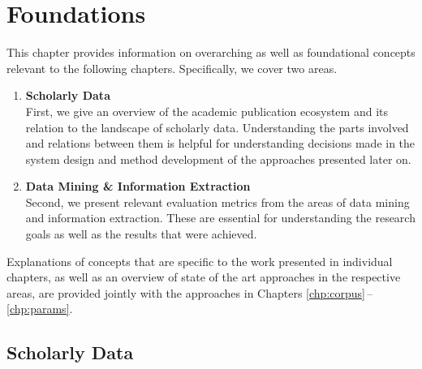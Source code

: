 \chapter{Foundations}
\label{chp:foundations}

This chapter provides information on overarching as well as foundational concepts relevant to the following chapters. Specifically, we cover two areas.

\begin{enumerate}
    \item \textbf{Scholarly Data}\\
        First, we give an overview of the academic publication ecosystem and its relation to the landscape of scholarly data. Understanding the parts involved and relations between them is helpful for understanding decisions made in the system design and method development of the approaches presented later on.
    \item \textbf{Data Mining \& Information Extraction}\\
        Second, we present relevant evaluation metrics from the areas of data mining and information extraction. These are essential for understanding the research goals as well as the results that were achieved.
\end{enumerate}

Explanations of concepts that are specific to the work presented in individual chapters, as well as an overview of state of the art approaches in the respective areas, are provided jointly with the approaches in Chapters \ref{chp:corpus}\,--\,\ref{chp:params}.

\section{Scholarly Data}



